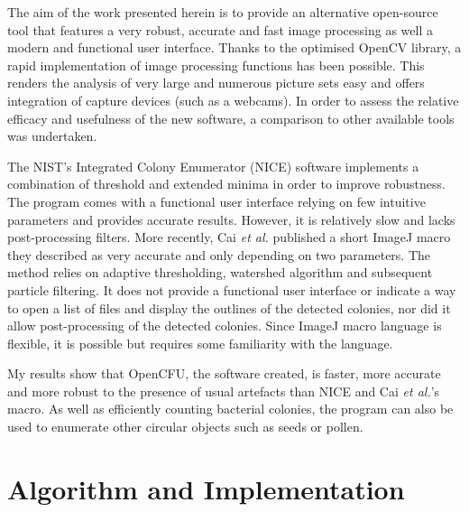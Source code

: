 \documentclass[10pt]{article}
\begin{document}
The aim of the work presented herein is to provide an alternative open-source tool that
features a very robust, accurate and fast image processing as well a modern and
functional user interface. Thanks to the optimised OpenCV
library\cite{opencv_library}, a rapid implementation of image processing
functions has been possible. This renders the analysis of very large and
numerous picture sets easy and offers integration of capture devices 
(such as a webcams). 
In order to assess the relative efficacy and usefulness of the new software,
a comparison to other available tools was undertaken.


The NIST's Integrated Colony Enumerator (NICE)\cite{clarke_lowcost_2010}
software
implements a combination of threshold and extended minima in order to improve robustness.
The program comes with a functional user interface relying on few intuitive parameters
and provides accurate results. 
However, it is relatively slow and lacks
post-processing filters.
More recently, Cai \emph{et al.} published\cite{cai_optimized_2011} a short
ImageJ macro they described as very accurate and only depending on two parameters.
The method relies on adaptive thresholding, watershed algorithm and subsequent particle filtering.
It does not provide a functional user interface or indicate a way to open a list
of files and display the outlines of the detected colonies, nor did it allow
post-processing of the detected colonies. 
Since ImageJ macro language is
flexible, it is possible but requires some familiarity with the language.

My results show that OpenCFU, the software created, is faster, more accurate and
more robust to the presence of usual artefacts than NICE and Cai \emph{et al.}'s macro.
As well as efficiently counting
bacterial colonies, the program can also 
be used to enumerate
other circular objects such as seeds or pollen. 


\section*{Algorithm and Implementation}
\end{document}
